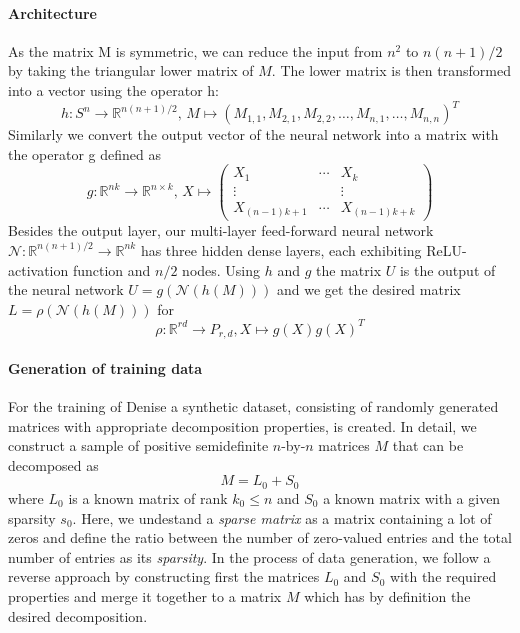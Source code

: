 \paragraph{Architecture}
As the matrix M is symmetric, we can reduce the input from $n^2$ to $n(n + 1)/2$ by taking the triangular lower matrix of $M$. The lower matrix is then transformed into a vector using the operator h:
\[
h: S^n \to \mathbb{R}^{n(n+1)/2}, \, M \mapsto (M_{1,1},M_{2,1},M_{2,2},\dots,M_{n,1},\dots,M_{n,n})^T
\]
Similarly we convert the output vector of the neural network into a matrix with the operator g defined as
\[
g : \mathbb{R}^{nk} \to \mathbb{R}^{n \times k}, \, X \mapsto \begin{pmatrix} X_1 & \cdots & X_k \\ \vdots & & \vdots \\ X_{(n-1)k + 1} & \cdots& X_{(n-1)k+k}\end{pmatrix}
\]
Besides the output layer, our multi-layer feed-forward neural network $\mathcal{N}: \mathbb{R}^{n(n+1)/2} \to \mathbb{R}^{nk} $ has three hidden dense layers, each exhibiting ReLU-activation function and $n/2$ nodes. Using $h$ and $g$ the matrix $U$ is the output of the neural network $U = g(\mathcal{N}(h(M)))$ and we  get the desired matrix $L=\rho(\mathcal{N}(h(M)))$ for
\[
\rho : \mathbb{R}^{rd} \to P_{r,d}, X \mapsto g(X)g(X)^T
\]


\paragraph{Generation of training data}
For the training of Denise a synthetic dataset, consisting of randomly generated matrices with appropriate decomposition properties, is created. In detail, we construct a sample of positive semidefinite $n$-by-$n$ matrices $M$ that can be decomposed as
\[
 M = L_0 + S_0
\]
where $L_0$ is a known matrix of rank $k_0 \leq n$ and $S_0$ a known matrix with a given sparsity $s_0$. Here, we undestand a \textit{sparse matrix} as a matrix containing a lot of zeros and define the ratio between the number of zero-valued entries and the total number of entries as its \textit{sparsity}. In the process of data generation, we follow a reverse approach by constructing first the matrices $L_0$ and $S_0$ with the required properties and merge it together to a matrix $M$ which has by definition the desired decomposition.

